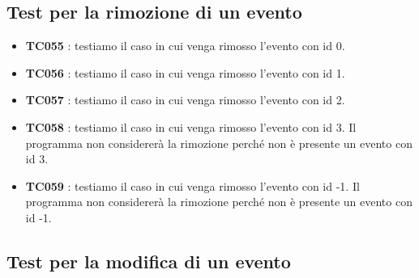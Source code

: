 \documentclass[11pt]{scrartcl} %
\begin{document}
\subsection{Test per la rimozione di un evento}

\begin{itemize}

	\item \textbf{TC055} : testiamo il caso in cui venga rimosso l'evento con id 0.

	\item \textbf{TC056} : testiamo il caso in cui venga rimosso l'evento con id 1.

	\item \textbf{TC057} : testiamo il caso in cui venga rimosso l'evento con id 2.

	\item \textbf{TC058} : testiamo il caso in cui venga rimosso l'evento con id 3. Il programma non considererà la rimozione perché non è presente un evento con id 3.

	\item \textbf{TC059} : testiamo il caso in cui venga rimosso l'evento con id -1. Il programma non considererà la rimozione perché non è presente un evento con id -1.

\end{itemize}

\subsection{Test per la modifica di un evento}
\end{document}
